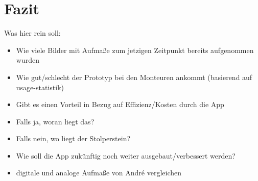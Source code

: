 \chapter{Fazit}
Was hier rein soll:\\
\begin{itemize}
  \item Wie viele Bilder mit Aufmaße zum jetzigen Zeitpunkt bereits aufgenommen wurden
  \item Wie gut/schlecht der Prototyp bei den Monteuren ankommt (basierend auf usage-statistik)
  \item Gibt es einen Vorteil in Bezug auf Effizienz/Kosten durch die App
  \item Falls ja, woran liegt das?
  \item Falls nein, wo liegt der Stolperstein?
  \item Wie soll die App zukünftig noch weiter ausgebaut/verbessert werden?
  \item digitale und analoge Aufmaße von André vergleichen
\end{itemize}
